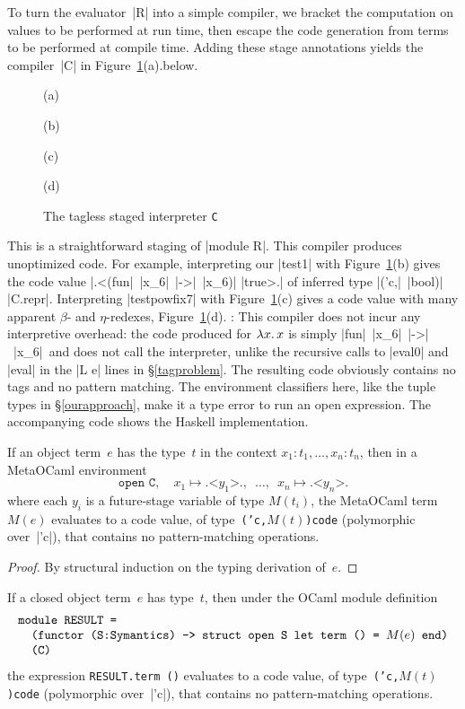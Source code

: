 To turn the evaluator~|R| into a simple compiler, we bracket the
computation on values to be performed at run time, then escape the code
generation from terms to be performed at compile time.  Adding these
stage annotations yields the compiler~|C|
\ifshort in Figure~\ref{fig:interpreter-C}(a).\else below.
\fi
\ifshort
\begin{figure}[t]
(a) 

\smallskip
(b) 

\smallskip
(c) 

\smallskip
(d) 

\medskip
\caption{The tagless staged interpreter \texttt{C}}
\label{fig:interpreter-C}
\end{figure}
\fi
This is a straightforward staging of
|module R|.
This compiler produces
unoptimized code. For example, interpreting our |test1| with
\ifshort Figure~\ref{fig:interpreter-C}(b) \else {}\fi
gives the code value |.<(fun|~|x_6|~|->|~|x_6)| |true>.|
of inferred type |('c,|~|bool)| |C.repr|.  Interpreting |testpowfix7|
with
\ifshort Figure~\ref{fig:interpreter-C}(c) \else {}\fi
gives a code value with many apparent $\beta$- and $\eta$-redexes\ifshort,
Figure~\ref{fig:interpreter-C}(d). \else: \fi
This compiler does not incur
any interpretive overhead: the
code produced for $\mathopen{\lambda\mathord{x}.\,}x$ is simply |fun|~|x_6|~|->|~|x_6|\ifshort\else\
and does not
call the interpreter, unlike the recursive calls to |eval0| and
|eval| in the |L e| lines in \S\ref{tagproblem}\fi.
The resulting code obviously contains no tags and no pattern matching.
The environment classifiers here, like the tuple types in \S\ref{ourapproach},
make it a type error to run an open expression.
\ifshort
The accompanying code shows the Haskell implementation. 
\else
\begin{proposition}
If an object term~$e$ has the type~$t$
in the context $x_1:t_1,\dotsc,x_n:t_n$,
then in a MetaOCaml environment
\[
    \texttt{open C},\quad
    x_1 \mapsto \texttt{.<$y_1$>.},\enspace
    \dotsc,\enspace
    x_n \mapsto \texttt{.<$y_n$>.}
\]
where each $y_i$ is a future-stage variable of type $M(t_i)$,
the MetaOCaml term~$M(e)$ evaluates to a code value,
of type~\texttt{('c,\:$M(t)$)\;code} (polymorphic over~|'c|),
that contains no pattern-matching operations.
\end{proposition}
\begin{proof}
    By structural induction on the typing derivation of~$e$.
\end{proof}
\begin{corollary}
If a closed object term~$e$ has type~$t$,
then under the OCaml module definition
\[
    \texttt{\begin{tabular}{@{}l@{}}
    module RESULT = \\
    \quad (functor (S:Symantics) -> struct open S let term () = $M(e)$ end) \\
    \quad (C)
    \end{tabular}}
\]
the expression \texttt{RESULT.term ()} evaluates to a code value,
of type~\texttt{('c,\:$M(t)$)\;code} (polymorphic over~|'c|),
that contains no pattern-matching operations.
\end{corollary}

